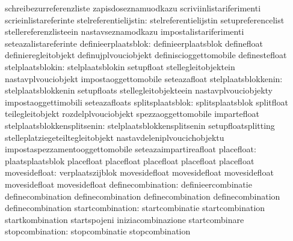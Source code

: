                                   schreibezurreferenzliste         zapisdoseznamuodkazu
                                  scriviinlistariferimenti         scrieinlistareferinte
           stelreferentielijstin: stelreferentielijstin            setupreferencelist
                                  stellereferenzlisteein           nastavseznamodkazu
                                  impostalistariferimenti          seteazalistareferinte
             definieerplaatsblok: definieerplaatsblok              definefloat
                                  definieregleitobjekt             definujplvouciobjekt
                                  definiscioggettomobile           definestefloat
                stelplaatsblokin: stelplaatsblokin                 setupfloat
                                  stellegleitobjektein             nastavplvouciobjekt
                                  impostaoggettomobile             seteazafloat
             stelplaatsblokkenin: stelplaatsblokkenin              setupfloats
                                  stellegleitobjekteein            nastavplvouciobjekty
                                  impostaoggettimobili             seteazafloats
                splitsplaatsblok: splitsplaatsblok                 splitfloat
                                  teilegleitobjekt                 rozdelplvouciobjekt
                                  spezzaoggettomobile              impartefloat
     stelplaatsblokkensplitsenin: stelplaatsblokkensplitsenin      setupfloatsplitting
                                  stelleplatziegeteiltegleitobjekt nastavdeleniplvoucichobjektu
                                  impostaspezzamentooggettomobile  seteazaimpartireafloat
                      placefloat: plaatsplaatsblok                 placefloat
                                  placefloat                       placefloat
                                  placefloat                       placefloat %
movesidefloat: verplaatszijblok  movesidefloat
               movesidefloat     movesidefloat
               movesidefloat     movesidefloat
               definecombination: definieercombinatie              definecombination
                                  definecombination                definecombination
                                  definecombination                definecombination
                startcombination: startcombinatie                  startcombination
                                  startkombination                 startspojeni
                                  iniziacombinazione               startcombinare
                 stopcombination: stopcombinatie                   stopcombination

